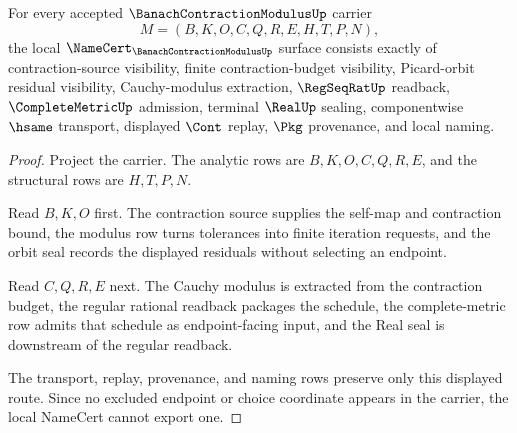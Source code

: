\begin{theorem}
\label{thm:banach-contraction-modulus-namecert-obligations}
For every accepted $\BanachContractionModulusUp$ carrier
$$
M=(B,K,O,C,Q,R,E,H,T,P,N),
$$
the local $\NameCert_{\BanachContractionModulusUp}$ surface consists exactly of contraction-source visibility, finite contraction-budget visibility, Picard-orbit residual visibility, Cauchy-modulus extraction, $\RegSeqRatUp$ readback, $\CompleteMetricUp$ admission, terminal $\RealUp$ sealing, componentwise $\hsame$ transport, displayed $\Cont$ replay, $\Pkg$ provenance, and local naming.
\end{theorem}
\begin{proof}
Project the carrier. The analytic rows are $B,K,O,C,Q,R,E$, and the structural rows are $H,T,P,N$.

Read $B,K,O$ first. The contraction source supplies the self-map and contraction bound, the modulus row turns tolerances into finite iteration requests, and the orbit seal records the displayed residuals without selecting an endpoint.

Read $C,Q,R,E$ next. The Cauchy modulus is extracted from the contraction budget, the regular rational readback packages the schedule, the complete-metric row admits that schedule as endpoint-facing input, and the Real seal is downstream of the regular readback.

The transport, replay, provenance, and naming rows preserve only this displayed route. Since no excluded endpoint or choice coordinate appears in the carrier, the local NameCert cannot export one.
\end{proof}

